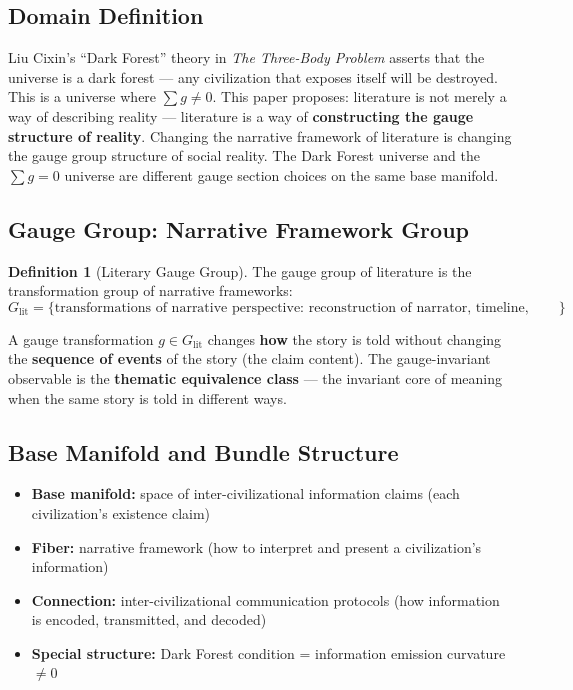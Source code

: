 \documentclass[12pt,a4paper]{article}
\theoremstyle{plain}
\theoremstyle{definition}
\newtheorem{definition}[theorem]{Definition}
\begin{document}
\subsection{Domain Definition}

Liu Cixin's ``Dark Forest'' theory in \textit{The Three-Body Problem} asserts that the universe is a dark forest — any civilization that exposes itself
will be destroyed. This is a universe where $\sum g \neq 0$. This paper proposes: literature is not merely a way of describing reality —
literature is a way of \textbf{constructing the gauge structure of reality}. Changing the narrative framework of literature is changing the gauge group structure of social reality. The Dark Forest universe and the $\sum g = 0$ universe are different gauge section choices on the same base manifold.

\subsection{Gauge Group: Narrative Framework Group}

\begin{definition}[Literary Gauge Group]
The gauge group of literature is the transformation group of narrative frameworks:
\begin{equation}
    G_{\text{lit}} = \{\text{transformations of narrative perspective: reconstruction of narrator, timeline, focalization, genre}\}
\end{equation}

A gauge transformation $g \in G_{\text{lit}}$ changes \textbf{how} the story is told without changing
the \textbf{sequence of events} of the story (the claim content). The gauge-invariant observable is the
\textbf{thematic equivalence class} — the invariant core of meaning when the same story is told in different ways.
\end{definition}

\subsection{Base Manifold and Bundle Structure}

\begin{itemize}
    \item \textbf{Base manifold:} space of inter-civilizational information claims (each civilization's existence claim)
    \item \textbf{Fiber:} narrative framework (how to interpret and present a civilization's information)
    \item \textbf{Connection:} inter-civilizational communication protocols (how information is encoded, transmitted, and decoded)
    \item \textbf{Special structure:} Dark Forest condition = information emission curvature $\neq 0$
\end{itemize}
\end{document}
